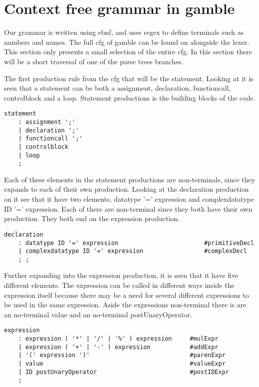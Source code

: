 \section{Context free grammar in gamble}
Our grammar is written using \acrfull{ebnf}, and uses \acrfull{regex} to define terminals such as numbers and names.
The full \acrshort{cfg} of \gls{gamble} can be found on  alongside  the lexer. This section only presents a small selection of the entire \acrshort{cfg}.
In this section there will be a short traversal of one of the parse trees branches.

The first production rule from the \acrshort{cfg} that will be the statement. 
Looking at  it is seen that a statement can be both a assignment, declaration, functioncall, controlblock and a loop. 
Statement productions is the building blocks of the code.

\begin{lstlisting}[caption={\acrshort{cfg} Statement},frame=tlrb,label={lst:statements},numbers=none]
statement
    : assignment ';'
    | declaration ';'
    | functioncall ';'
    | controlblock
    | loop
    ;
\end{lstlisting}

Each of these elements in the statement productions are non-terminals, since they expands to each of their own production.
Looking at the declaration production on  it see that it have two elements, datatype '=' expression and complexdatatype ID '=' expression.
Each of there are non-terminal since they both have their own production. They both end on the expression production.

\begin{lstlisting}[caption={\acrshort{cfg} Declaration},frame=tlrb,label={lst:declaration},numbers=none]
declaration
    : datatype ID '=' expression                        #primitiveDecl
    | complexdatatype ID '=' expression                 #complexDecl
    ; ;
\end{lstlisting}

Further expanding into the expression production, it is seen that it have five different elements.
The expression can be called in different ways inside the expression itself because there may be a need for several different expressions to be used in the same expression.
Aside the expressions non-terminal there is are an no-terminal value and an no-terminal postUnaryOperator.
\begin{lstlisting}[caption={\acrshort{cfg} Expression},frame=tlrb,label={lst:expression},numbers=none]
expression
    : expression ( '*' | '/' | '%' ) expression     #mulExpr
    | expression ( '+' | '-' ) expression           #addExpr
    | '(' expression ')'                            #parenExpr
    | value                                         #valueExpr
    | ID postUnaryOperator                          #postIDExpr
    ;
\end{lstlisting}
  
